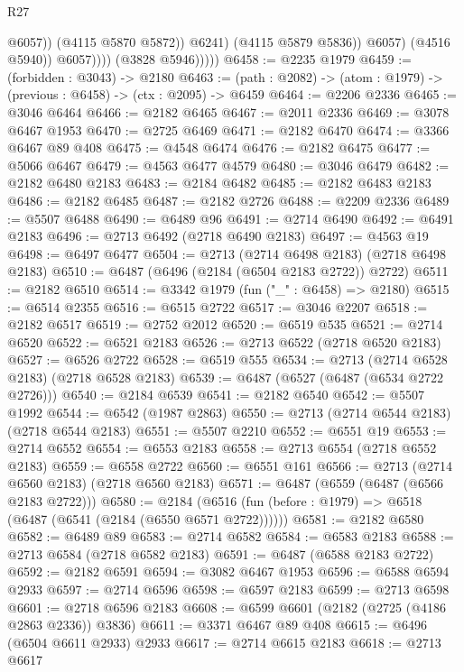 \begin{lexlean}{R27}
\begin{coremodule}
                                  @6057))
                              (@4115 @5870 @5872))
                            @6241)
                          (@4115 @5879 @5836))
                        @6057)
                      (@4516 @5940))
                    @6057))))
            (@3828 @5946)))))
@6458 := @2235 @1979
@6459 := (forbidden : @3043) -> @2180
@6463 := (path : @2082) -> (atom : @1979) -> (previous : @6458) -> (ctx : @2095) -> @6459
@6464 := @2206 @2336
@6465 := @3046 @6464
@6466 := @2182 @6465
@6467 := @2011 @2336
@6469 := @3078 @6467 @1953
@6470 := @2725 @6469
@6471 := @2182 @6470
@6474 := @3366 @6467 @89 @408
@6475 := @4548 @6474
@6476 := @2182 @6475
@6477 := @5066 @6467
@6479 := @4563 @6477 @4579
@6480 := @3046 @6479
@6482 := @2182 @6480 @2183
@6483 := @2184 @6482
@6485 := @2182 @6483 @2183
@6486 := @2182 @6485
@6487 := @2182 @2726
@6488 := @2209 @2336
@6489 := @5507 @6488
@6490 := @6489 @96
@6491 := @2714 @6490
@6492 := @6491 @2183
@6496 := @2713 @6492 (@2718 @6490 @2183)
@6497 := @4563 @19
@6498 := @6497 @6477
@6504 := @2713 (@2714 @6498 @2183) (@2718 @6498 @2183)
@6510 := @6487 (@6496 (@2184 (@6504 @2183 @2722)) @2722)
@6511 := @2182 @6510
@6514 := @3342 @1979 (fun ("_" : @6458) => @2180)
@6515 := @6514 @2355
@6516 := @6515 @2722
@6517 := @3046 @2207
@6518 := @2182 @6517
@6519 := @2752 @2012
@6520 := @6519 @535
@6521 := @2714 @6520
@6522 := @6521 @2183
@6526 := @2713 @6522 (@2718 @6520 @2183)
@6527 := @6526 @2722
@6528 := @6519 @555
@6534 := @2713 (@2714 @6528 @2183) (@2718 @6528 @2183)
@6539 := @6487 (@6527 (@6487 (@6534 @2722 @2726)))
@6540 := @2184 @6539
@6541 := @2182 @6540
@6542 := @5507 @1992
@6544 := @6542 (@1987 @2863)
@6550 := @2713 (@2714 @6544 @2183) (@2718 @6544 @2183)
@6551 := @5507 @2210
@6552 := @6551 @19
@6553 := @2714 @6552
@6554 := @6553 @2183
@6558 := @2713 @6554 (@2718 @6552 @2183)
@6559 := @6558 @2722
@6560 := @6551 @161
@6566 := @2713 (@2714 @6560 @2183) (@2718 @6560 @2183)
@6571 := @6487 (@6559 (@6487 (@6566 @2183 @2722)))
@6580 := @2184 (@6516 (fun (before : @1979) => @6518 (@6487 (@6541 (@2184 (@6550 @6571 @2722))))))
@6581 := @2182 @6580
@6582 := @6489 @89
@6583 := @2714 @6582
@6584 := @6583 @2183
@6588 := @2713 @6584 (@2718 @6582 @2183)
@6591 := @6487 (@6588 @2183 @2722)
@6592 := @2182 @6591
@6594 := @3082 @6467 @1953
@6596 := @6588 @6594 @2933
@6597 := @2714 @6596
@6598 := @6597 @2183
@6599 := @2713 @6598
@6601 := @2718 @6596 @2183
@6608 := @6599 @6601 (@2182 (@2725 (@4186 @2863 @2336)) @3836)
@6611 := @3371 @6467 @89 @408
@6615 := @6496 (@6504 @6611 @2933) @2933
@6617 := @2714 @6615 @2183
@6618 := @2713 @6617

\end{coremodule}
\end{lexlean}

